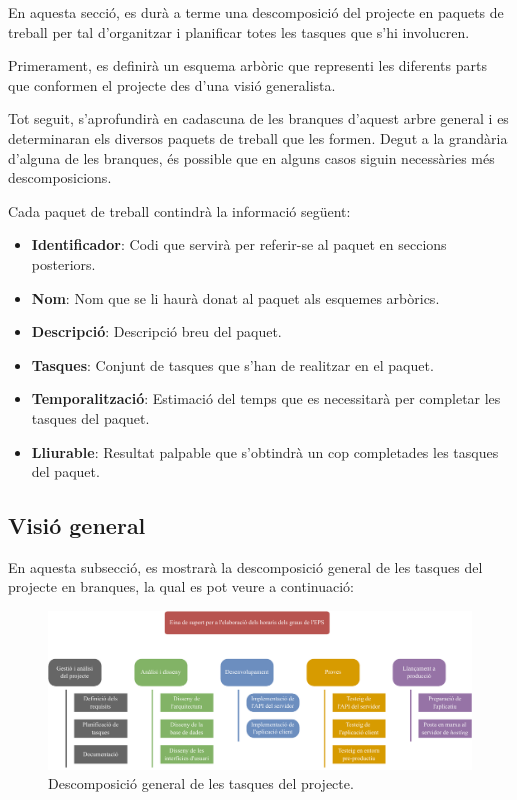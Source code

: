 \documentclass[a4paper,12pt]{ThesisStyle}
\begin{document}
En aquesta secció, es durà a terme una descomposició del projecte en paquets de treball per tal d'organitzar i planificar totes les tasques que s'hi involucren.

Primerament, es definirà un esquema arbòric que representi les diferents parts que conformen el projecte des d'una visió generalista.

Tot seguit, s'aprofundirà en cadascuna de les branques d'aquest arbre general i es determinaran els diversos paquets de treball que les formen. Degut a la grandària d'alguna de les branques, és possible que en alguns casos siguin necessàries més descomposicions.

Cada paquet de treball contindrà la informació següent:
\begin{itemize}
  \item \textbf{Identificador}: Codi que servirà per referir-se al paquet en seccions posteriors.
  \item \textbf{Nom}: Nom que se li haurà donat al paquet als esquemes arbòrics.
  \item \textbf{Descripció}: Descripció breu del paquet.
  \item \textbf{Tasques}: Conjunt de tasques que s'han de realitzar en el paquet.
  \item \textbf{Temporalització}: Estimació del temps que es necessitarà per completar les tasques del paquet.
  \item \textbf{Lliurable}: Resultat palpable que s'obtindrà un cop completades les tasques del paquet.
\end{itemize}

\subsection{Visió general}
\label{subsec:visio_general}

En aquesta subsecció, es mostrarà la descomposició general de les tasques del projecte en branques, la qual es pot veure a continuació:

\begin{figure}[H]
	\centering
	\includegraphics[width=\textwidth]{assets/working_packages/general.pdf}
	\caption{\label{img:pt_general}Descomposició general de les tasques del projecte.}
\end{figure}
\end{document}
